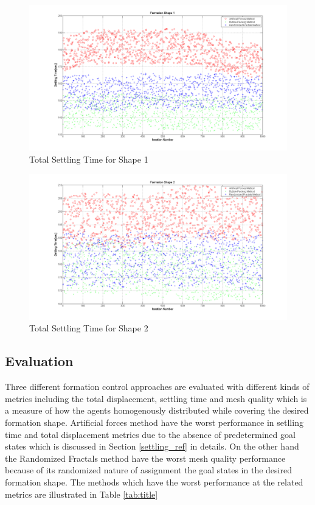 \begin{figure}[H]
\caption{Total Settling Time for Shape 1} \label{settling_1}
\centerline{\includegraphics[scale = 0.35]{Total_Time_Shape_1}}
\end{figure} 
		
\begin{figure}[H]
\caption{Total Settling Time for Shape 2} \label{settling_2}
\centerline{\includegraphics[scale = 0.35]{Total_Time_Shape_2}}
\end{figure} 
		 
\subsection{Evaluation} 
Three different formation control approaches are evaluated with different kinds of metrics including the total displacement, settling time and mesh quality which is a measure of how the agents homogenously distributed while covering the desired formation shape. Artificial forces method have the worst performance in setlling time and total displacement metrics due to the absence of predetermined goal states which is discussed in Section \ref{settling_ref} in details. On the other hand the Randomized Fractals method have the worst mesh quality performance because of its randomized nature of assignment the goal states in the desired formation shape. The methods which have the worst performance at the related metrics are illustrated in Table \ref{tab:title}
		
